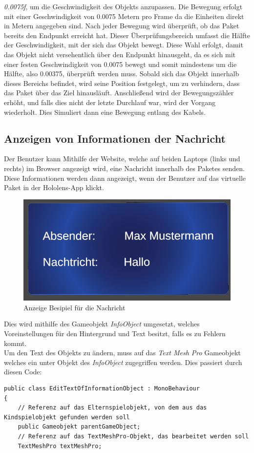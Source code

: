 \begin{itemize}
    \textit{0.0075f}, um die Geschwindigkeit des Objekts anzupassen. Die Bewegung erfolgt mit einer Geschwindigkeit von 0.0075 Metern pro
    Frame da die Einheiten direkt in Metern angegeben sind. Nach jeder Bewegung wird überprüft, ob das Paket bereits den Endpunkt erreicht
    hat. Dieser Überprüfungsbereich umfasst die Hälfte der Geschwindigkeit, mit der sich das Objekt bewegt. Diese Wahl erfolgt, damit das
    Objekt nicht versehentlich über den Endpunkt hinausgeht, da es sich mit einer festen Geschwindigkeit von 0.0075 bewegt und somit mindestens
    um die Hälfte, also 0.00375, überprüft werden muss. Sobald sich das Objekt innerhalb dieses Bereichs befindet, wird seine Position festgelegt,
    um zu verhindern, dass das Paket über das Ziel hinausläuft. Anschließend wird der Bewegungszähler erhöht, und falls dies nicht
    der letzte Durchlauf war, wird der Vorgang wiederholt. Dies Simuliert dann eine Bewegung entlang des Kabels.


    \subsection{\label{sec:pingInfoJonas}Anzeigen von Informationen der Nachricht}
    Der Benutzer kann Mithilfe der Website, welche auf beiden Laptops (links und rechts) im Browser angezeigt wird, eine Nachricht
    innerhalb des Paketes senden. Diese Informationen werden dann angezeigt, wenn der Benutzer auf das virtuelle Paket in der Hololens-App klickt.
    \begin{figure}[H]
        \centering
        \includegraphics[width=0.5\linewidth]{images/NachrichtenAnzeige.png}
        \caption{Anzeige Besipiel für die Nachricht}
        \label{fig:enter-label}
    \end{figure}
    Dies wird mithilfe des Gameobjekt \textit{InfoObject} umgesetzt, welches Voreinstellungen für den Hintergrund und Text besitzt, falls es zu Fehlern kommt. \\
    Um den Text des Objekts zu ändern, muss auf das \textit{Text Mesh Pro} Gameobjekt welches ein unter Objekt des \textit{InfoObject} zugegriffen werden. Dies passiert durch diesen Code:
    \begin{lstlisting}[style=csharp, caption={Kind vom Gameobjekt bekommen}, label=code:]
public class EditTextOfInformationObject : MonoBehaviour
{
    // Referenz auf das Elternspielobjekt, von dem aus das Kindspielobjekt gefunden werden soll
    public Gameobjekt parentGameObject;
    // Referenz auf das TextMeshPro-Objekt, das bearbeitet werden soll
    TextMeshPro textMeshPro;


\end{lstlisting}
\end{itemize}
